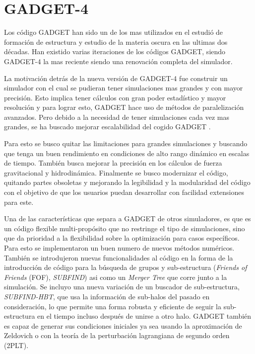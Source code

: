 \section{GADGET-4}

Los código GADGET han sido un de los mas utilizados en el estudió de formación de estructura y estudio de la materia oscura en las ultimas dos décadas. Han existido varias iteraciones de los códigos GADGET, siendo GADGET-4 la mas reciente siendo una renovación completa del simulador. 

La motivación detrás de la nueva versión de GADGET-4 fue construir un simulador con el cual se pudieran tener simulaciones mas grandes y con mayor precisión. Esto implica tener cálculos con gran poder estadístico y mayor resolución y para lograr esto, GADGET hace uso de métodos de paralelización avanzados. Pero debido a la necesidad de tener simulaciones cada vez mas grandes, se ha buscado mejorar escalabilidad del cogido GADGET \cite{2021MNRAS.506.2871S}.

Para esto se busco quitar las limitaciones para grandes simulaciones y buscando que tenga un buen rendimiento en condiciones de alto rango dinámico en escalas de tiempo. También busca mejorar la precisión en los cálculos de fuerza gravitacional y hidrodinámica. Finalmente se busco modernizar el código, quitando partes obsoletas y mejorando la legibilidad y la modularidad del código con el objetivo de que los usuarios puedan desarrollar con facilidad extensiones para este. 

 
Una de las características que separa a GADGET de otros simuladores, es que es un código flexible multi-propósito que no restringe el tipo de simulaciones, sino que da prioridad a la flexibilidad  sobre la optimización para casos específicos. Para esto se implementaron un buen numero de nuevos métodos numéricos. También se introdujeron nuevas funcionalidades al código en la forma de la introducción de código para la búsqueda de grupos y sub-estructura (\textit{Friends of Friends} (FOF), \textit{SUBFIND}) asi como un \textit{Merger Tree} que corre junto a la simulación. Se incluyo una nueva variación de un buscador de sub-estructura, \textit{SUBFIND-HBT}, que usa la información de sub-halos del pasado en consideración, lo que permite una forma robusta y eficiente de seguir la sub-estructura en el tiempo incluso después de unirse a otro halo. GADGET también es capaz de generar sus condiciones iniciales ya sea usando la aproximación de Zeldovich o con la teoría de la perturbación lagrangiana de segundo orden (2PLT)\cite{2021MNRAS.506.2871S}.



